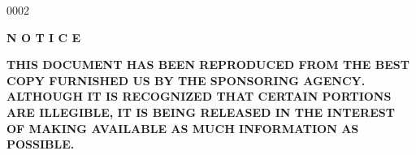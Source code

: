 \begin{scanpage}{0002}{}
\thispagestyle{empty}\vspace*{5cm}
\begin{center}\Large\bfseries N O T I C E\end{center}
{\large\bfseries\noindent THIS DOCUMENT HAS BEEN REPRODUCED FROM THE BEST COPY FURNISHED US BY THE SPONSORING AGENCY. ALTHOUGH IT IS RECOGNIZED THAT CERTAIN PORTIONS ARE ILLEGIBLE, IT IS BEING RELEASED IN THE INTEREST OF MAKING AVAILABLE AS MUCH INFORMATION AS POSSIBLE.\par}
\end{scanpage}
